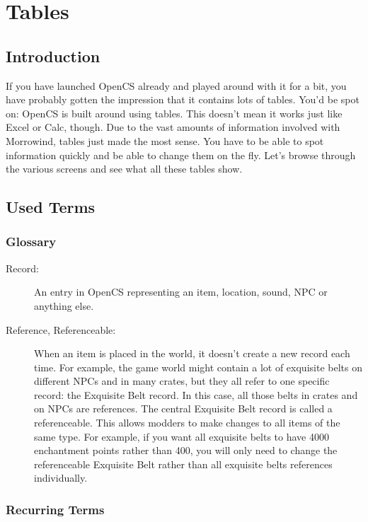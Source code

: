 \section{Tables}

\subsection{Introduction}
If you have launched OpenCS already and played around with it for a bit, you have probably gotten the impression that it contains lots of tables. You'd be spot on: OpenCS is built around using tables. This doesn't mean it works just like Excel or Calc, though. Due to the vast amounts of information involved with Morrowind, tables just made the most sense. You have to be able to spot information quickly and be able to change them on the fly. Let's browse through the various screens and see what all these tables show.



\subsection{Used Terms}

\subsubsection{Glossary}

\begin{description}
 \item[Record:] An entry in OpenCS representing an item, location, sound, NPC or anything else.

 \item[Reference, Referenceable:] When an item is placed in the world, it doesn't create a new record each time. For example, the game world might contain a lot of exquisite belts on different NPCs and in many crates, but they all refer to one specific record: the Exquisite Belt record. In this case, all those belts in crates and on NPCs are references. The central Exquisite Belt record is called a referenceable. This allows modders to make changes to all items of the same type. For example, if you want all exquisite belts to have 4000 enchantment points rather than 400, you will only need to change the referenceable Exquisite Belt rather than all exquisite belts references individually.
\end{description}

\subsubsection{Recurring Terms}


